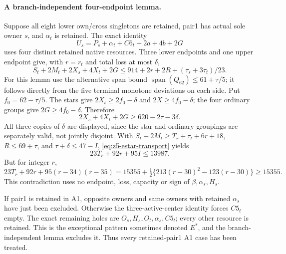 \documentclass[11pt,letterpaper]{article}
\theoremstyle{definition}\newtheorem{definition}[theorem]{Definition}
\begin{document}
\paragraph{A branch-independent four-endpoint lemma.}\label{par:z5-estar}
Suppose all eight lower own/cross singletons are retained, pair1 has
actual sole owner $s$, and $\alpha_t$ is retained. The exact identity
\[
 U_s=P_s+\alpha_t+C6_t+2a+4b+2G
\]
uses four distinct retained native resources. Three lower endpoints and
one upper endpoint give, with $r=r_t$ and total loss at most $\delta$,
\begin{equation}\label{eq:z5-estar-transport}
 S_t+2M_t+2X_s+4X_t+2G
 \le914+2r+2R+(\tau_s+3\tau_t)/23.
\end{equation}
For this lemma use the alternative span bound
$\operatorname{span}(Q_{62})\le61+\tau/5$; it follows directly from
the five terminal monotone deviations on each side. Put $f_0=62-\tau/5$.
The stars give $2X_t\ge2f_0-\delta$ and $2X\ge4f_0-\delta$;
the four ordinary groups give $2G\ge4f_0-\delta$. Therefore
\[
 2X_s+4X_t+2G\ge620-2\tau-3\delta.
\]
All three copies of $\delta$ are displayed, since the star and ordinary
groupings are separately valid, not jointly disjoint. With
$S_t+2M_t\ge T_r+\tau_t+6r+18$, $R\le69+\tau$, and
$\tau+\delta\le47-I$, \eqref{eq:z5-estar-transport} yields
\begin{equation}\label{eq:z5-estar-final}
 23T_r+92r+95I\le13987.
\end{equation}
But for integer $r$,
\[
 23T_r+92r+95(r-34)(r-35)
 =15355+\tfrac12\{213(r-30)^2-123(r-30)\}\ge15355.
\]
This contradiction uses no endpoint, loss, capacity or sign of
$\beta,\alpha_s,H_s$.

If pair1 is retained in A1, opposite owners and same owners with retained
$\alpha_s$ have just been excluded. Otherwise the three-active-center
identity forces $C5_t$ empty. The exact remaining holes are
$O_s,H_s,O_t,\alpha_s,C5_t$; every other resource is retained.
This is the exceptional pattern sometimes denoted $E^*$, and the
branch-independent lemma excludes it. Thus every retained-pair1 A1 case
has been treated.
\end{document}

